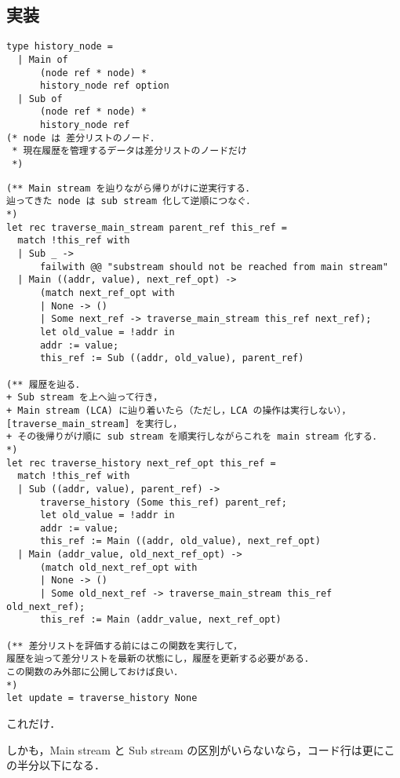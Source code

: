 \documentclass[10pt, a4j, twocolumn]{scrartcl}
\begin{document}
\subsection{実装}
\label{sec:orge997cc4}

\begin{lstlisting}
type history_node =
  | Main of
      (node ref * node) *
      history_node ref option
  | Sub of
      (node ref * node) *
      history_node ref
(* node は 差分リストのノード．
 * 現在履歴を管理するデータは差分リストのノードだけ
 *)
\end{lstlisting}


\begin{lstlisting}
(** Main stream を辿りながら帰りがけに逆実行する．
辿ってきた node は sub stream 化して逆順につなぐ．
*)
let rec traverse_main_stream parent_ref this_ref =
  match !this_ref with
  | Sub _ -> 
      failwith @@ "substream should not be reached from main stream"
  | Main ((addr, value), next_ref_opt) ->
      (match next_ref_opt with
      | None -> ()
      | Some next_ref -> traverse_main_stream this_ref next_ref);
      let old_value = !addr in
      addr := value;
      this_ref := Sub ((addr, old_value), parent_ref)

(** 履歴を辿る．
+ Sub stream を上へ辿って行き，
+ Main stream (LCA) に辿り着いたら（ただし，LCA の操作は実行しない），[traverse_main_stream] を実行し，
+ その後帰りがけ順に sub stream を順実行しながらこれを main stream 化する．
*)
let rec traverse_history next_ref_opt this_ref =
  match !this_ref with
  | Sub ((addr, value), parent_ref) ->
      traverse_history (Some this_ref) parent_ref;
      let old_value = !addr in
      addr := value;
      this_ref := Main ((addr, old_value), next_ref_opt)
  | Main (addr_value, old_next_ref_opt) ->
      (match old_next_ref_opt with
      | None -> ()
      | Some old_next_ref -> traverse_main_stream this_ref old_next_ref);
      this_ref := Main (addr_value, next_ref_opt)

(** 差分リストを評価する前にはこの関数を実行して，
履歴を辿って差分リストを最新の状態にし，履歴を更新する必要がある．
この関数のみ外部に公開しておけば良い．
*)
let update = traverse_history None
\end{lstlisting}


これだけ．

しかも，Main stream と Sub stream の区別がいらないなら，コード行は更にこの半分以下になる．
\end{document}
